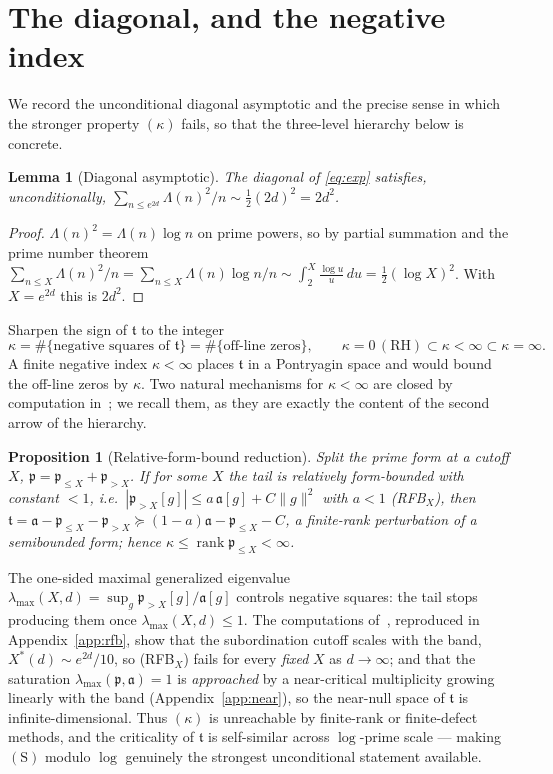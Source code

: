 \documentclass[11pt]{amsart}
\newtheorem{proposition}[theorem]{Proposition}
\newtheorem{lemma}[theorem]{Lemma}
\theoremstyle{definition}
\theoremstyle{remark}
\newcommand{\fa}{\mathfrak a}
\newcommand{\fp}{\mathfrak p}
\newcommand{\ft}{\mathfrak t}
\newcommand{\RH}{\mathrm{RH}}
\DeclareMathOperator{\rank}{rank}
\begin{document}
\section{The diagonal, and the negative index}\label{sec:kappa}
We record the unconditional diagonal asymptotic and the precise sense in which
the stronger property $(\kappa)$ fails, so that the three-level hierarchy below
is concrete.

\begin{lemma}[Diagonal asymptotic]\label{lem:diag}
The diagonal of \eqref{eq:exp} satisfies, unconditionally,
$\sum_{n\le e^{2d}}\Lambda(n)^2/n\sim\tfrac12(2d)^2=2d^2$.
\end{lemma}
\begin{proof}
$\Lambda(n)^2=\Lambda(n)\log n$ on prime powers, so by partial summation and the
prime number theorem $\sum_{n\le X}\Lambda(n)^2/n=\sum_{n\le X}\Lambda(n)\log n/n
\sim\int_2^X\frac{\log u}{u}\,du=\tfrac12(\log X)^2$. With $X=e^{2d}$ this is
$2d^2$.
\end{proof}

Sharpen the sign of $\ft$ to the integer
\[
\kappa=\#\{\text{negative squares of }\ft\}=\#\{\text{off-line zeros}\},\qquad
\kappa=0\,(\RH)\subset\kappa<\infty\subset\kappa=\infty.
\]
A finite negative index $\kappa<\infty$ places $\ft$ in a Pontryagin space and
would bound the off-line zeros by $\kappa$. Two natural mechanisms for
$\kappa<\infty$ are closed by computation in~\cite{RP16}; we recall them, as they
are exactly the content of the second arrow of the hierarchy.

\begin{proposition}[Relative-form-bound reduction]\label{prop:rfb}
Split the prime form at a cutoff $X$, $\fp=\fp_{\le X}+\fp_{>X}$. If for some $X$
the tail is relatively form-bounded with constant $<1$, i.e.\
$|\fp_{>X}[g]|\le a\,\fa[g]+C\|g\|^2$ with $a<1$ \emph{(RFB$_X$)}, then
$\ft=\fa-\fp_{\le X}-\fp_{>X}\succeq(1-a)\fa-\fp_{\le X}-C$, a finite-rank
perturbation of a semibounded form; hence $\kappa\le\rank\fp_{\le X}<\infty$.
\end{proposition}

The one-sided maximal generalized eigenvalue $\lambda_{\max}(X,d)=\sup_g
\fp_{>X}[g]/\fa[g]$ controls negative squares: the tail stops producing them once
$\lambda_{\max}(X,d)\le1$. The computations of~\cite{RP16}, reproduced in
Appendix~\ref{app:rfb}, show that the subordination cutoff scales with the band,
$X^\ast(d)\sim e^{2d}/10$, so (RFB$_X$) fails for every \emph{fixed} $X$ as
$d\to\infty$; and that the saturation $\lambda_{\max}(\fp,\fa)=1$ is
\emph{approached} by a near-critical multiplicity growing linearly with the band
(Appendix~\ref{app:near}), so the near-null space of $\ft$ is infinite-dimensional.
Thus $(\kappa)$ is unreachable by finite-rank or finite-defect methods, and the
criticality of $\ft$ is self-similar across $\log$-prime scale --- making
$(\mathrm S)$ modulo $\log$ genuinely the strongest unconditional statement
available.
\end{document}
